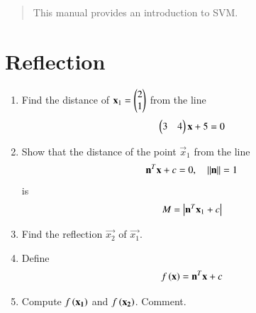 \documentclass[journal,12pt,twocolumn]{IEEEtran}
\renewcommand\thesection{\arabic{section}}
\begin{document}
% 







\maketitle

\tableofcontents

\renewcommand{\thefigure}{\theenumi}
\renewcommand{\thetable}{\theenumi}

\begin{abstract}
This manual provides an introduction to SVM.
\end{abstract}

\section{Reflection}
\begin{enumerate}[label=\thesection.\arabic*,ref=\thesection.\theenumi]

\item Find the distance of $\mathbf{x}_1 = \begin{pmatrix}2 \\ 1\end{pmatrix}$ from the line
\begin{align}
\begin{pmatrix}3 & 4\end{pmatrix}\mathbf{x} + 5 = 0
\end{align}

\item Show that the distance of the point  $\vec{x}_1$ from the line 
\begin{align}
\mathbf{n}^T\mathbf{x} +c = 0, \quad \left\Vert\mathbf{n}\right\Vert = 1
\end{align}
is
\begin{align}
M = \left\vert\mathbf{n}^T\mathbf{x}_1 +c\right\vert
\end{align}

\item Find the reflection $\vec{x_2}$ of $\vec{x_1}$.
\item Define
\begin{align}
f\left(\mathbf{x}\right)=\mathbf{n}^T\mathbf{x} +c
\end{align}
\item Compute $f\left(\mathbf{x_1}\right)$ and $f\left(\mathbf{x_2}\right)$.  Comment.

\end{enumerate}
\end{document}
